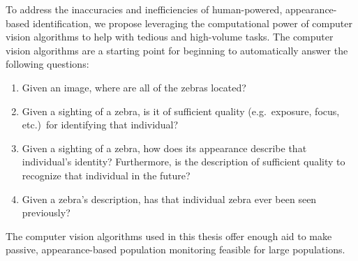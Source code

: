 To address the inaccuracies and inefficiencies of human-powered, appearance-based identification, we propose leveraging the computational power of computer vision algorithms to help with tedious and high-volume tasks.  The computer vision algorithms are a starting point for beginning to automatically answer the following questions:
\begin{enumerate}
    \item Given an image, where are all of the zebras located?  %
    \item Given a sighting of a zebra, is it of sufficient quality (e.g.\ exposure, focus, etc.)\ for identifying that individual?  %
    \item Given a sighting of a zebra, how does its appearance describe that individual's identity?  Furthermore, is the description of sufficient quality to recognize that individual in the future?  %
    \item Given a zebra's description, has that individual zebra ever been seen previously?  %
\end{enumerate}
The computer vision algorithms used in this thesis offer enough aid to make passive, appearance-based population monitoring feasible for large populations.

